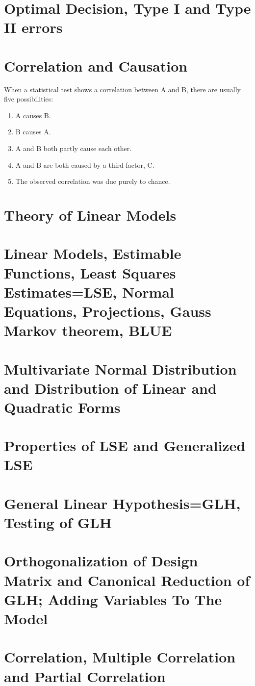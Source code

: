 \section{Optimal Decision, Type I and Type II errors}
\section{Correlation and Causation}
When a statistical test shows a correlation between A and B, there are usually five possibilities:
\begin{enumerate}
\item A causes B.
\item B causes A.
\item A and B both partly cause each other.
\item A and B are both caused by a third factor, C.
\item The observed correlation was due purely to chance.
\end{enumerate}

\section{Theory of Linear Models}
\section{Linear Models, Estimable Functions, Least Squares Estimates=LSE, Normal Equations, Projections, Gauss Markov theorem, BLUE}
\section{Multivariate Normal Distribution and Distribution of Linear and Quadratic Forms}
\section{Properties of LSE and Generalized LSE}
\section{General Linear Hypothesis=GLH, Testing of GLH}
\section{Orthogonalization of Design Matrix and Canonical Reduction of GLH;  Adding Variables To The Model}
\section{Correlation, Multiple Correlation and  Partial Correlation}
